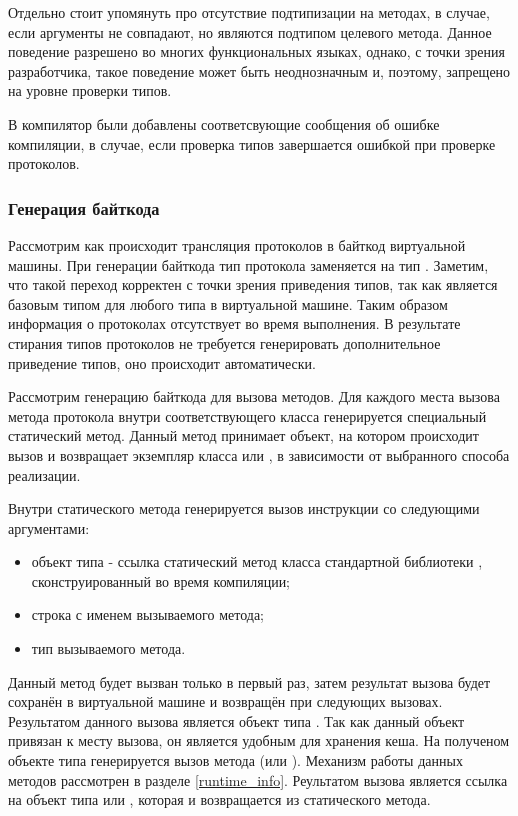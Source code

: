 Отдельно стоит упомянуть про отсутствие подтипизации на методах, в случае, если аргументы не совпадают, но являются подтипом целевого метода. Данное поведение разрешено во многих функциональных языках, однако, с точки зрения разработчика, такое поведение может быть неоднозначным и, поэтому, запрещено на уровне проверки типов.

В компилятор были добавлены соответсвующие сообщения об ошибке компиляции, в случае, если проверка типов завершается ошибкой при проверке протоколов.

\subsubsection{Генерация байткода}
Рассмотрим как происходит трансляция протоколов в байткод виртуальной машины. При генерации байткода тип протокола заменяется на тип . Заметим, что такой переход корректен с точки зрения приведения типов, так как  является базовым типом для любого типа в виртуальной машине. Таким образом информация о протоколах отсутствует во время выполнения. В результате стирания типов протоколов не требуется генерировать дополнительное приведение типов, оно происходит автоматически.

Рассмотрим генерацию байткода для вызова методов. Для каждого места вызова метода протокола внутри соответствующего класса генерируется специальный статический метод. Данный метод принимает объект, на котором происходит вызов и возвращает экземпляр класса  или , в зависимости от выбранного способа реализации.

Внутри статического метода генерируется вызов инструкции  со следующими аргументами:
\begin{itemize}
  \item объект типа  - ссылка статический метод  класса стандартной библиотеки , сконструированный во время компиляции;
  \item строка с именем вызываемого метода;
  \item тип вызываемого метода.
\end{itemize}

Данный метод будет вызван только в первый раз, затем результат вызова будет сохранён в виртуальной машине и возвращён при следующих вызовах. Результатом данного вызова является объект типа . Так как данный объект привязан к месту вызова, он является удобным для хранения кеша. На полученом объекте типа  генерируется вызов метода (или ). Механизм работы данных методов рассмотрен в разделе \ref{runtime_info}. Реультатом вызова является ссылка на объект типа  или , которая и возвращается из статического метода.

